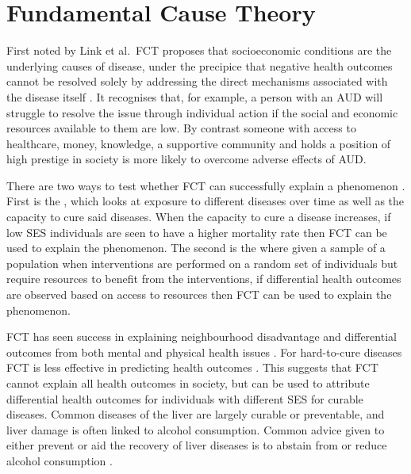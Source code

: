 \section{Fundamental Cause Theory}

First noted by Link et al.~\ac{FCT} proposes that socioeconomic conditions are the underlying causes of disease, under the precipice that negative health outcomes cannot be resolved solely by addressing the direct mechanisms associated with the disease itself \cite{FCTorigin}. It recognises that, for example, a person with an \ac{AUD} will struggle to resolve the issue through individual action if the social and economic resources available to them are low. By contrast someone with  access to healthcare, money, knowledge, a supportive community and holds a position of high prestige in society is more likely to overcome adverse effects of \ac{AUD}. 

There are two ways to test whether \ac{FCT} can successfully explain a phenomenon \cite{fctRetro}. First is the , which looks at exposure to different diseases over time as well as the capacity to cure said diseases. When the capacity to cure a disease increases, if low \ac{SES} individuals are seen to have a higher mortality rate then \ac{FCT} can be used to explain the phenomenon.
The second is the  where given a sample of a population when interventions are performed on a random set of individuals but require resources to benefit from the interventions, if differential health outcomes are observed based on access to resources then \ac{FCT} can be used to explain the phenomenon.


\ac{FCT} has seen success in explaining neighbourhood disadvantage and differential outcomes from both mental and physical health issues \cite{fctNeighbourhoods, fctStressors, fctLungCancerUS}. For hard-to-cure diseases \ac{FCT} is less effective in predicting health outcomes \cite{fctLungCancerUS}. This suggests that \ac{FCT} cannot explain all health outcomes in society, but can be used to attribute differential health outcomes for individuals with different \ac{SES} for curable diseases. Common diseases of the liver are largely curable or preventable, and liver damage is often linked to alcohol consumption. Common advice given to either prevent or aid the recovery of liver diseases is to abstain from or reduce alcohol consumption \cite{liverDiseaseList}. 

